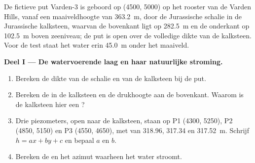 \begin{problem}
\label{pb:b3:hydrogeology:1}
De fictieve put Varden-3 is geboord op (4500, 5000) op het rooster van de
Varden Hills, vanaf een maaiveldhoogte van \qty{363.2}{m}, door de
Jurassische schalie in de Jurassische kalksteen, waarvan de bovenkant ligt op
\qty{282.5}{m} en de onderkant op \qty{102.5}{m} boven zeeniveau; de put is open
over de volledige dikte van de kalksteen. Voor de test staat het water erin
\qty{45.0}{m} onder het maaiveld.

\medskip\noindent\textbf{Deel I --- De watervoerende laag en haar natuurlijke stroming.}
\begin{enumerate}
\item Bereken de dikte van de schalie en van de kalksteen bij de put.
\item Bereken de  in de kalksteen en de drukhoogte aan de bovenkant.
  Waarom is de kalksteen hier een ?
\item Drie piezometers, open naar de kalksteen, staan op P1 (4300, 5250), P2
  (4850, 5150) en P3 (4550, 4650), met  van 318.96, 317.34 en
  \qty{317.52}{m}. Schrijf $h = ax + by + c$ en bepaal $a$ en $b$.
\item Bereken de  en het azimut waarheen het
  water stroomt.
\end{enumerate}


\end{problem}

